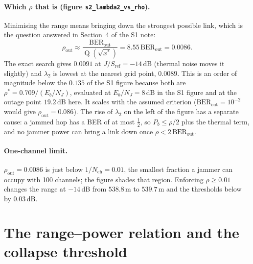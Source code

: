 \documentclass[11pt,a4paper]{article}
\newcommand{\Q}{\operatorname{Q}}
\newcommand{\BERout}{\mathrm{BER}_{\mathrm{out}}}
\begin{document}
\paragraph{Which $\rho$ that is (figure \texttt{s2\_lambda2\_vs\_rho}).}
Minimising the range means bringing down the strongest possible link, which is
the question answered in Section~4 of the S1 note:
\[
  \rho_{\mathrm{out}} \approx \frac{\BERout}{\Q(\sqrt{x^\ast})} = 8.55\,\BERout = 0.0086 .
\]
The exact search gives $0.0091$ at $J/S_{\mathrm{ref}}=-14$\,dB (thermal noise
moves it slightly) and $\lambda_2$ is lowest at the nearest grid point,
$0.0089$. This is an order of magnitude below the $0.135$ of the S1 figure
because both are $\rho^\ast=0.709/(E_b/N_J)$, evaluated at $E_b/N_J=8$\,dB in
the S1 figure and at the outage point $19.2$\,dB here. It scales with the
assumed criterion
($\BERout=10^{-2}$ would give $\rho_{\mathrm{out}}=0.086$).
The rise of $\lambda_2$ on the left of the figure has a separate cause: a
jammed hop has a BER of at most $\tfrac12$, so $P_b\le\rho/2$ plus the thermal
term, and no jammer power can bring a link down once $\rho<2\,\BERout$.

\paragraph{One-channel limit.}
$\rho_{\mathrm{out}}=0.0086$ is just below $1/N_{\mathrm{ch}}=0.01$, the
smallest fraction a jammer can occupy with 100 channels; the figure shades
that region. Enforcing $\rho\ge0.01$ changes the range at $-14$\,dB from
$538.8$\,m to $539.7$\,m and the thresholds below by $0.03$\,dB.

\section{The range--power relation and the collapse threshold}
\end{document}
